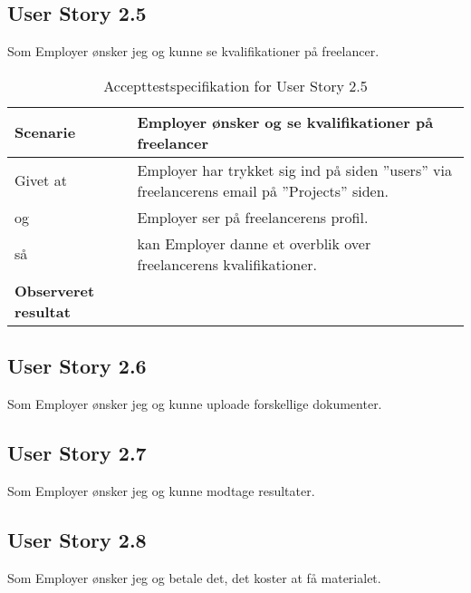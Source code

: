 \subsection{User Story 2.5}
Som Employer ønsker jeg og kunne se kvalifikationer på freelancer.

\begin{table}[H]
	\centering
	\caption{Accepttestspecifikation for User Story 2.5 }
	\begin{tabular}{p{8cm}|p{8cm}}
		\hline
		\textbf{Scenarie} & Employer ønsker og se kvalifikationer på freelancer\\[10px]
		\hline
		Givet at & Employer har trykket sig ind på siden ''users'' via freelancerens email på ''Projects'' siden.\\
        \hline
        og & Employer ser på freelancerens profil.\\
        \hline
        så & kan Employer danne et overblik over freelancerens kvalifikationer.\\
		\hline
		\rowcolor{white}
		\textbf{Observeret resultat} & \\
		\hline
	\end{tabular}
\end{table}

\subsection{User Story 2.6}
Som Employer ønsker jeg og kunne uploade forskellige dokumenter.


\subsection{User Story 2.7}
Som Employer ønsker jeg og kunne modtage resultater.


\subsection{User Story 2.8}
Som Employer ønsker jeg og betale det, det koster at få materialet.
